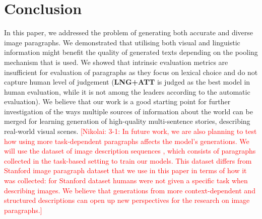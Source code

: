\documentclass[11pt,a4paper]{article}
\newcommand{\kibitz}[2]{\ifnum\Comments=1\textcolor{#1}{#2}\fi}
\newcommand{\nikolai}[1]{\kibitz{red}  {[Nikolai: #1]}}
\begin{document}
\section{Conclusion}


In this paper, we addressed the problem of generating both accurate and diverse image paragraphs.
We demonstrated that utilising both visual and linguistic information might benefit the quality of generated texts depending on the pooling mechanism that is used.
We showed that intrinsic evaluation metrics are insufficient for evaluation of paragraphs as they focus on lexical choice and do not capture human level of judgement (\textbf{LNG+ATT} is judged as the best model in human evaluation, while it is not among the leaders according to the automatic evaluation).
We believe that our work is a good starting point for further investigation of the ways multiple sources of information about the world can be merged for learning generation of high-quality multi-sentence stories, describing real-world visual scenes.
\nikolai{3-1:
In future work, we are also planning to test how using more task-dependent paragraphs affects the model's generations.
We will use the dataset of image description sequences \cite{ilinykh19}, which consists of paragraphs collected in the task-based setting to train our models.
This dataset differs from Stanford image paragraph dataset that we use in this paper in terms of how it was collected: for Stanford dataset humans were not given a specific task when describing images.
We believe that generations from more context-dependent and structured descriptions can open up new perspectives for the research on image paragraphs.}



\end{document}
